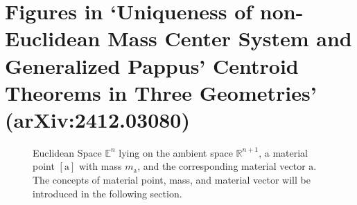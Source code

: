 \documentclass{amsart}
\newcommand{\vc}[1]{\bm{\mathrm{#1}}}
\begin{document}
\newpage

\section{Figures in `Uniqueness of non-Euclidean Mass Center System and Generalized Pappus' Centroid Theorems in Three Geometries' (arXiv:2412.03080)}

\begin{figure}[h!]
    \begin{center}
        
        \caption{Euclidean Space $\mathbb{E}^n$ lying on the ambient space $\mathbb{R}^{n+1}$, a material point $[\vc a]$ with mass $m_{\vc a}$, and the corresponding material vector $\vc a$. The concepts of material point, mass, and material vector will be introduced in the following section. }\label{efig1}
    \end{center}
\end{figure}
\end{document}
